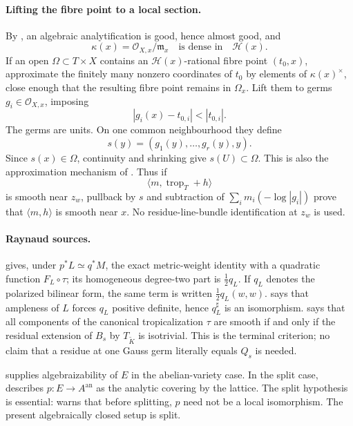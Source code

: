 \paragraph{Lifting the fibre point to a local section.}
By \cite[\S11.1.10]{CLD25}, an algebraic analytification is good, hence
almost good, and
\[
 \kappa(x)=\mathcal O_{X,x}/\mathfrak m_x
       \quad\text{is dense in}\quad\mathscr H(x).
\]
If an open \(\Omega\subset T\times X\) contains an
\(\mathscr H(x)\)-rational fibre point \((t_0,x)\), approximate the finitely
many nonzero coordinates of \(t_0\) by elements of \(\kappa(x)^\times\),
close enough that the resulting fibre point remains in \(\Omega_x\).
Lift them to germs \(g_i\in\mathcal O_{X,x}\), imposing
\[
                   |g_i(x)-t_{0,i}|<|t_{0,i}|.
\]
The germs are units.  On one common neighbourhood they define
\[
 s(y)=(g_1(y),\ldots,g_r(y),y).
\]
Since \(s(x)\in\Omega\), continuity and shrinking give \(s(U)\subset\Omega\).
This is also the approximation mechanism of
\cite[Lemma~12.2.3]{CLD25}.  Thus if
\[
 \langle m,\operatorname{trop}_T+h\rangle
\]
is smooth near \(z_w\), pullback by \(s\) and subtraction of
\(\sum_i m_i(-\log|g_i|)\) prove that \(\langle m,h\rangle\) is smooth near
\(x\).  No residue-line-bundle identification at \(z_w\) is used.

\paragraph{Raynaud sources.}
\cite[Proposition~19.2.5]{CLD25} gives, under
\(p^*L\simeq q^*M\), the exact metric-weight identity with a quadratic
function \(F_L\circ\tau\); its homogeneous degree-two part is
\(\frac12q_L\).  If \(q_L\) denotes the polarized bilinear form, the same
term is written \(\frac12q_L(w,w)\).
\cite[Theorem~B.6.4]{CLD25} says that ampleness of \(L\) forces \(q_L\)
positive definite, hence \(q_L^\sharp\) is an isomorphism.
\cite[Remark~19.2.3]{CLD25} says that all components of the canonical
tropicalization \(\tau\) are smooth if and only if the residual extension
of \(B_s\) by \(T_{\widetilde K}\) is isotrivial.  This is the terminal
criterion; no claim that a residue at one Gauss germ literally equals
\(Q_s\) is needed.

\cite[Remark~B.6.6]{CLD25} supplies algebraizability of \(E\) in the
abelian-variety case.  In the split case, \cite[\S19.2.1 and
\S\S B.5.12--B.5.13]{CLD25} describes \(p:E\to A^{\mathrm{an}}\) as the
analytic covering by the lattice.  The split hypothesis is essential:
\cite[\S B.5.14]{CLD25} warns that before splitting, \(p\) need not be a
local isomorphism.  The present algebraically closed setup is split.

